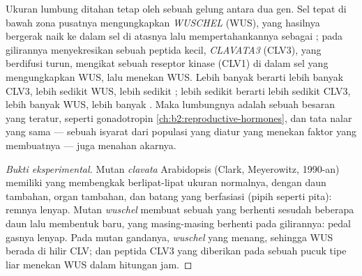 \begin{proposition}\label{prop:b2:plant-meristems:wus}
Ukuran lumbung  ditahan tetap oleh sebuah gelung antara dua
gen. Sel tepat di bawah zona pusatnya mengungkapkan 
\emph{WUSCHEL} (WUS), yang hasilnya bergerak naik ke dalam sel di
atasnya lalu mempertahankannya sebagai ;  pada
gilirannya menyekresikan sebuah peptida kecil, \emph{CLAVATA3} (CLV3),
yang berdifusi turun, mengikat sebuah reseptor kinase (CLV1) di dalam
sel yang mengungkapkan WUS, lalu menekan WUS. Lebih banyak 
berarti lebih banyak CLV3, lebih sedikit WUS, lebih sedikit ;
lebih sedikit  berarti lebih sedikit CLV3, lebih banyak WUS,
lebih banyak . Maka lumbungnya adalah sebuah besaran yang
teratur, seperti gonadotropin \cref{ch:b2:reproductive-hormones}, dan
tata nalar yang sama --- sebuah isyarat dari populasi yang diatur yang
menekan faktor yang membuatnya --- juga menahan  akarnya.
\end{proposition}
\begin{proof}[Bukti eksperimental]
Mutan \emph{clavata} Arabidopsis (Clark, Meyerowitz, 1990-an) memiliki
 yang membengkak berlipat-lipat ukuran normalnya, dengan daun
tambahan, organ  tambahan, dan batang yang berfasiasi (pipih
seperti pita): remnya lenyap. Mutan \emph{wuschel} membuat sebuah
 yang berhenti sesudah beberapa daun lalu membentuk 
baru, yang masing-masing berhenti pada gilirannya: pedal gasnya lenyap.
Pada mutan gandanya,  \emph{wuschel} yang menang, sehingga WUS
berada di hilir CLV; dan peptida CLV3 yang diberikan pada sebuah pucuk
tipe liar menekan WUS dalam hitungan jam.
\end{proof}

